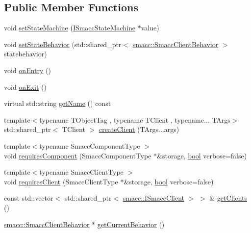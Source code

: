 \subsection*{Public Member Functions}
\begin{DoxyCompactItemize}
\item 
void \hyperlink{classsmacc_1_1Orthogonal_a05f65c01344a6c8593f7f88c0ca19654}{set\+State\+Machine} (\hyperlink{classsmacc_1_1ISmaccStateMachine}{I\+Smacc\+State\+Machine} $\ast$value)
\item 
void \hyperlink{classsmacc_1_1Orthogonal_a5534eca0c1e191156c4005c4fbc53c4e}{set\+State\+Behavior} (std\+::shared\+\_\+ptr$<$ \hyperlink{classsmacc_1_1SmaccClientBehavior}{smacc\+::\+Smacc\+Client\+Behavior} $>$ statebehavior)
\item 
void \hyperlink{classsmacc_1_1Orthogonal_a77888104f276bdbd177d69cf23f11a56}{on\+Entry} ()
\item 
void \hyperlink{classsmacc_1_1Orthogonal_a71c0df3d9e8327e65286e1ce0a3a7043}{on\+Exit} ()
\item 
virtual std\+::string \hyperlink{classsmacc_1_1Orthogonal_ae1ad57a2fda4d7f2ecf708c342fc1bb9}{get\+Name} () const 
\item 
{\footnotesize template$<$typename T\+Object\+Tag , typename T\+Client , typename... T\+Args$>$ }\\std\+::shared\+\_\+ptr$<$ T\+Client $>$ \hyperlink{classsmacc_1_1Orthogonal_a8676cb5a7fe77d5ba1ddca2c2f4946df}{create\+Client} (T\+Args...\+args)
\item 
{\footnotesize template$<$typename Smacc\+Component\+Type $>$ }\\void \hyperlink{classsmacc_1_1Orthogonal_a098b5be0f89d0911afc44c10b756ef2a}{requires\+Component} (Smacc\+Component\+Type $\ast$\&storage, \hyperlink{classbool}{bool} verbose=false)
\item 
{\footnotesize template$<$typename Smacc\+Client\+Type $>$ }\\void \hyperlink{classsmacc_1_1Orthogonal_af6f6d9cc5bf5433f5fe3b640a6a0b8aa}{requires\+Client} (Smacc\+Client\+Type $\ast$\&storage, \hyperlink{classbool}{bool} verbose=false)
\item 
const std\+::vector$<$ std\+::shared\+\_\+ptr$<$ \hyperlink{classsmacc_1_1ISmaccClient}{smacc\+::\+I\+Smacc\+Client} $>$ $>$ \& \hyperlink{classsmacc_1_1Orthogonal_aee5bcdacccdc3450785983fe58e11d1b}{get\+Clients} ()
\item 
\hyperlink{classsmacc_1_1SmaccClientBehavior}{smacc\+::\+Smacc\+Client\+Behavior} $\ast$ \hyperlink{classsmacc_1_1Orthogonal_aadeadc3928ea8e0b223021361691ec3c}{get\+Current\+Behavior} ()
\end{DoxyCompactItemize}
